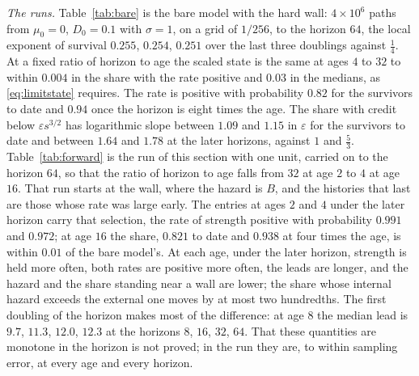 \emph{The runs.} Table~\ref{tab:bare} is the bare model with the hard
wall: $4\times10^6$ paths from $\mu_0=0$, $D_0=0.1$ with $\sigma=1$, on a
grid of $1/256$, to the horizon $64$, the local exponent of survival
$0.255$, $0.254$, $0.251$ over the last three doublings
against $\tfrac14$. At a fixed ratio of horizon to age the scaled state
is the same at ages $4$ to $32$ to within $0.004$ in the share
with the rate positive and $0.03$ in the medians, as
\eqref{eq:limitstate} requires. The rate is positive with probability
$0.82$ for the survivors to date and $0.94$ once the horizon is
eight times the age. The share with credit below $\varepsilon s^{3/2}$
has logarithmic slope between $1.09$ and $1.15$ in
$\varepsilon$ for the survivors to date and between $1.64$ and
$1.78$ at the later horizons, against $1$ and $\tfrac53$.
Table~\ref{tab:forward} is the run of this section with one unit, carried on to
the horizon $64$, so that the ratio of horizon to age falls from $32$ at
age $2$ to $4$ at age $16$. That run starts at the wall,
where the hazard is $B$, and the histories that last are those whose rate
was large early. The entries at ages $2$ and $4$ under the later horizon
carry that selection, the rate of strength positive with probability
$0.991$ and $0.972$; at age $16$ the share, $0.821$ to date
and $0.938$ at four times the age, is within $0.01$ of the bare
model's. At each age, under the later horizon, strength is held more
often, both rates are positive more often, the leads are longer, and the hazard
and the share standing near a wall are lower; the share whose internal
hazard exceeds the external one moves by at most two hundredths. The
first doubling of the horizon makes most of the difference: at age $8$
the median lead is $9.7$, $11.3$, $12.0$, $12.3$ at
the horizons $8$, $16$, $32$, $64$. That these quantities are monotone
in the horizon is not proved; in the run they are, to within sampling
error, at every age and every horizon.

